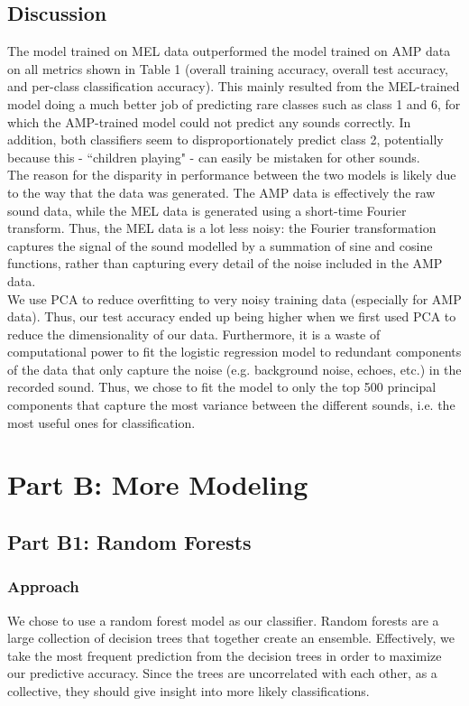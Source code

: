 \documentclass[11pt]{article}
\begin{document}
\subsection{Discussion}

The model trained on MEL data outperformed the model trained on AMP data on all metrics shown in Table 1 (overall training accuracy, overall test accuracy, and per-class classification accuracy). This mainly resulted from the MEL-trained model doing a much better job of predicting rare classes such as class 1 and 6, for which the AMP-trained model could not predict any sounds correctly. In addition, both classifiers seem to disproportionately predict class 2, potentially because this - ``children playing" - can easily be mistaken for other sounds.\\

\noindent The reason for the disparity in performance between the two models is likely due to the way that the data was generated. The AMP data is effectively the raw sound data, while the MEL data is generated using a short-time Fourier transform. Thus, the MEL data is a lot less noisy: the Fourier transformation captures the signal of the sound modelled by a summation of sine and cosine functions, rather than capturing every detail of the noise included in the AMP data.\\

\noindent We use PCA to reduce overfitting to very noisy training data (especially for AMP data). Thus, our test accuracy ended up being higher when we first used PCA to reduce the dimensionality of our data. Furthermore, it is a waste of computational power to fit the logistic regression model to redundant components of the data that only capture the noise (e.g. background noise, echoes, etc.) in the recorded sound. Thus, we chose to fit the model to only the top 500 principal components that capture the most variance between the different sounds, i.e. the most useful ones for classification.

\section{Part B: More Modeling}

\subsection{Part B1: Random Forests}

\subsubsection{Approach}
We chose to use a random forest model as our classifier. Random forests are a large collection of decision trees that together create an ensemble. Effectively, we take the most frequent prediction from the decision trees in order to maximize our predictive accuracy. Since the trees are uncorrelated with each other, as a collective, they should give insight into more likely classifications.\\ 
\end{document}

